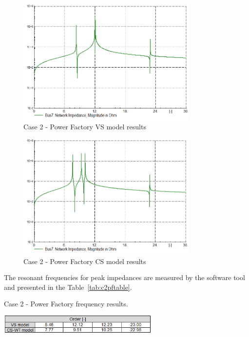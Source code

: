 \documentclass[12pt]{report} %
\begin{document}
\begin{figure}[htb]
	\centering
	\includegraphics[width=0.8\textwidth]{img/Case2/PF_imp7_VS.PNG}
  	\caption{Case 2 - Power Factory VS model results}
  	\label{fig:c2pfvs1}
\end{figure}
\FloatBarrier

\begin{figure}[htb]
	\centering
	\includegraphics[width=0.8\textwidth]{img/Case2/PF_imp7_CS.PNG}
  	\caption{Case 2 - Power Factory CS model results}
  	\label{fig:c2pfcs1}
\end{figure}
\FloatBarrier

The resonant frequencies for peak impedances are measured by the software tool and presented in the Table~\ref{tab:c2pftable}.

\begin{table}[htb]
	\centering
	\caption{Case 2 - Power Factory frequency results.}
	\includegraphics[width=0.6\textwidth]{img/Case2/table_powerfactory.PNG}
  	\label{tab:c2pftable}
\end{table}
\FloatBarrier
\end{document}
